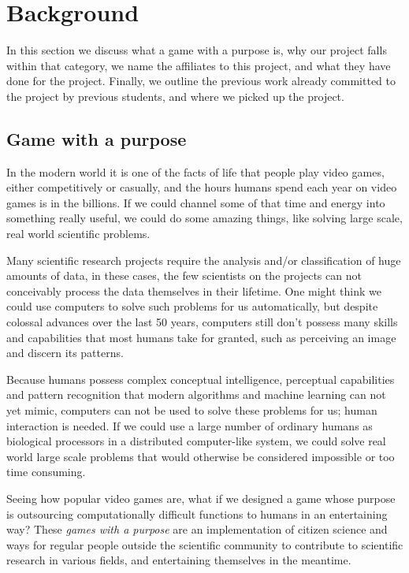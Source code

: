 \section{Background}\label{sec:background}
	In this section we discuss what a game with a purpose is, why our project falls within that category, we name the affiliates to this project, and what they have done for the project. Finally, we outline the previous work already committed to the project by previous students, and where we picked up the project.

\subsection{Game with a purpose}
	In the modern world it is one of the facts of life that people play video games, either competitively or casually, and the hours humans spend each year on video games is in the billions. If we could channel some of that time and energy into something really useful, we could do some amazing things, like solving large scale, real world scientific problems.

	Many scientific research projects require the analysis and/or classification of huge amounts of data, in these cases, the few scientists on the projects can not conceivably process the data themselves in their lifetime. One might think we could use computers to solve such problems for us automatically, but despite colossal advances over the last 50 years, computers still don't possess many skills and capabilities that most humans take for granted, such as perceiving an image and discern its patterns.

	Because humans possess complex conceptual intelligence, perceptual capabilities and pattern recognition that modern algorithms and machine learning can not yet mimic, computers can not be used to solve these problems for us; human interaction is needed. If we could use a large number of ordinary humans as biological processors in a distributed computer-like system, we could solve real world large scale problems that would otherwise be considered impossible or too time consuming.

	Seeing how popular video games are, what if we designed a game whose purpose is outsourcing computationally difficult functions to humans in an entertaining way? These \emph{games with a purpose} are an implementation of citizen science and ways for regular people outside the scientific community to contribute to scientific research in various fields, and entertaining themselves in the meantime.

